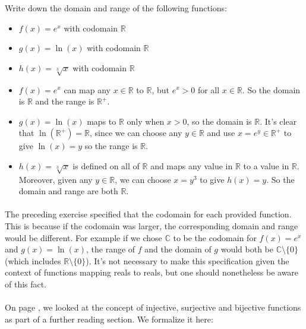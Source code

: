 \documentclass[12pt, a4paper, titlepage, twoside]{article}
\newcommand*{\R}{\mathbb{R}}
\newcommand*{\C}{\mathbb{C}}
\newcounter{excount}[subsection]
\begin{document}
	\begin{ex}
		Write down the domain and range of the following functions:
		
		\begin{itemize}
			\item $f(x) = e^x$ with codomain $\R$
			\item $g(x) = \ln(x)$ with codomain $\R$
			\item $h(x) = \sqrt[3]{x}$ with codomain $\R$
		\end{itemize}
		
		\tcbline
		\hfill
		
		\begin{itemize}
			\item $f(x) = e^x$ can map any $x \in \R$ to $\R$, but $e^x > 0$ for all $x \in \R$. So the domain is $\R$ and the range
			is $\R^+$.
			\item $g(x) = \ln(x)$ maps to $\R$ only when $x > 0$, so the domain is $\R$. It's clear that $\ln(\R^+) = \R$, since we can 
			choose any $y \in \R$ and use $x = e^y \in \R^+$ to give $\ln(x) = y$ so the range is $\R$.
			\item $h(x) = \sqrt[3]{x}$ is defined on all of $\R$ and maps any value in $\R$ to a value in $\R$. Moreover, given any $y \in \R$, we
			can choose $x = y^3$ to give $h(x) = y$. So the domain and range are both $\R$.
		\end{itemize}
	\end{ex}
	
	\paragraph{}
	The preceding exercise specified that the codomain for each provided function. This is because if the codomain was larger, the corresponding
	domain and range would be different. For example if we chose $\C$ to be the codomain for $f(x) = e^x$ and $g(x) = \ln(x)$, the range of
	$f$ and the domain of $g$ would both be $\C \setminus \{0\}$ (which includes $\R \setminus \{0\}$). It's not necessary to make this 
	specification given the context of functions mapping reals to reals, but one should nonetheless be aware of this fact.
	
	\paragraph{}
	On page \pageref*{fr:countability}, we looked at the concept of injective, surjective and bijective functions as part of a further reading section.
	We formalize it here:\\
	
\end{document}

